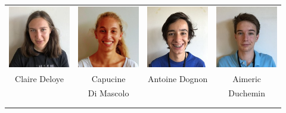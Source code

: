 \begin{center}
\begin{tabular}{cccc}
\includegraphics[angle=270,origin=c, width=27mm]{eleves/Deloye Claire.JPG} &
\includegraphics[angle=0,origin=c, width=27mm]{eleves/Di Mascolo Capucine.JPG} &
\includegraphics[angle=270,origin=c, width=27mm]{eleves/Dognon Antoine.JPG} &
\includegraphics[angle=270,origin=c, width=27mm]{eleves/Duchemin Aimeric.JPG} \\
Claire Deloye & Capucine & Antoine Dognon & Aimeric \\ & Di Mascolo & & Duchemin \\ \\ \\


\end{tabular}
\end{center}
